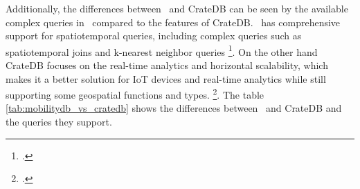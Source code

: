 Additionally, the differences between \mobilitydbc~and CrateDB can be seen by the available complex queries in \mobilitydbc~compared to the features of CrateDB.
\mobilitydbc~has comprehensive support for spatiotemporal queries, including complex queries such as spatiotemporal joins and k-nearest neighbor queries \parencite{bakliDistributedSpatiotemporalTrajectory2020} \footcite{QueryingDataMobilitydbDocs}.
On the other hand CrateDB focuses on the real-time analytics and horizontal scalability, which makes it a better solution for IoT devices and real-time analytics while still supporting some geospatial functions and types. \footcite{CrateDBDocumentation}.
The table \ref{tab:mobilitydb_vs_cratedb} shows the differences between \mobilitydbc~and CrateDB and the queries they support.
